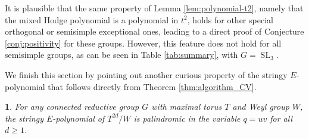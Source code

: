 \documentclass[11pt,english]{amsart}
\numberwithin{equation}{section}
\numberwithin{figure}{section}
\theoremstyle{plain}
\newtheorem{prop}[thm]{\protect\propositionname}
\theoremstyle{plain}
\theoremstyle{definition}
\theoremstyle{remark}
\newcommand{\SL}{\operatorname{SL}}
\providecommand{\propositionname}{Proposition}
\begin{document}
It is plausible that the same property of Lemma \ref{lem:polynomial-t2}, namely that the mixed Hodge polynomial is a polynomial in $t^2$, holds for other special orthogonal or semisimple exceptional ones, leading to a direct proof of Conjecture \ref{conj:positivity} for these groups. However, this feature does not hold for all semisimple groups, as can be seen in Table \ref{tab:summary}, with  $G = \SL_3$.

We finish this section by pointing out another curious property of the stringy $E$-polynomial that follows directly from Theorem \ref{thm:algorithm_CV}.

\begin{prop}\label{prop:palindromic}
For any connected reductive group $G$ with maximal torus $T$ and Weyl group $W$, the stringy $E$-polynomial of $T^{2d}/W$ is palindromic in the variable $q=uv$ for all $d \geq 1$.
\end{prop}
\end{document}
